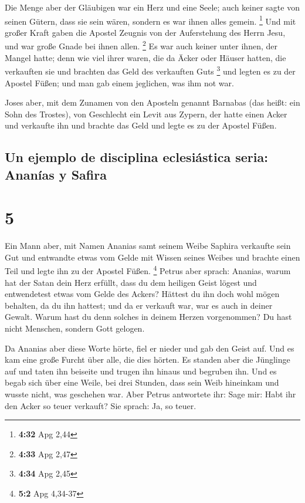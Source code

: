  Die Menge aber der Gläubigen war ein Herz und eine
Seele; auch keiner sagte von seinen Gütern, dass sie sein wären, sondern
es war ihnen alles gemein. \footnote{\textbf{4:32} Apg 2,44}
 Und mit großer Kraft gaben die Apostel Zeugnis von der
Auferstehung des Herrn Jesu, und war große Gnade bei ihnen allen.
\footnote{\textbf{4:33} Apg 2,47}  Es war auch keiner
unter ihnen, der Mangel hatte; denn wie viel ihrer waren, die da Äcker
oder Häuser hatten, die verkauften sie und brachten das Geld des
verkauften Guts \footnote{\textbf{4:34} Apg 2,45}  und
legten es zu der Apostel Füßen; und man gab einem jeglichen, was ihm not
war.

 Joses aber, mit dem Zunamen von den Aposteln genannt
Barnabas (das heißt: ein Sohn des Trostes), von Geschlecht ein Levit aus
Zypern,  der hatte einen Acker und verkaufte ihn und
brachte das Geld und legte es zu der Apostel Füßen.

\hypertarget{un-ejemplo-de-disciplina-eclesiuxe1stica-seria-ananuxedas-y-safira}{%
\subsection{Un ejemplo de disciplina eclesiástica seria: Ananías y
Safira}\label{un-ejemplo-de-disciplina-eclesiuxe1stica-seria-ananuxedas-y-safira}}

\hypertarget{section-4}{%
\section{5}\label{section-4}}

 Ein Mann aber, mit Namen Ananias samt seinem Weibe
Saphira verkaufte sein Gut  und entwandte etwas vom Gelde
mit Wissen seines Weibes und brachte einen Teil und legte ihn zu der
Apostel Füßen. \footnote{\textbf{5:2} Apg 4,34-37}  Petrus
aber sprach: Ananias, warum hat der Satan dein Herz erfüllt, dass du dem
heiligen Geist lögest und entwendetest etwas vom Gelde des Ackers?
 Hättest du ihn doch wohl mögen behalten, da du ihn
hattest; und da er verkauft war, war es auch in deiner Gewalt. Warum
hast du denn solches in deinem Herzen vorgenommen? Du hast nicht
Menschen, sondern Gott gelogen.

 Da Ananias aber diese Worte hörte, fiel er nieder und gab
den Geist auf. Und es kam eine große Furcht über alle, die dies hörten.
 Es standen aber die Jünglinge auf und taten ihn beiseite
und trugen ihn hinaus und begruben ihn.  Und es begab sich
über eine Weile, bei drei Stunden, dass sein Weib hineinkam und wusste
nicht, was geschehen war.  Aber Petrus antwortete ihr:
Sage mir: Habt ihr den Acker so teuer verkauft? Sie sprach: Ja, so
teuer.

